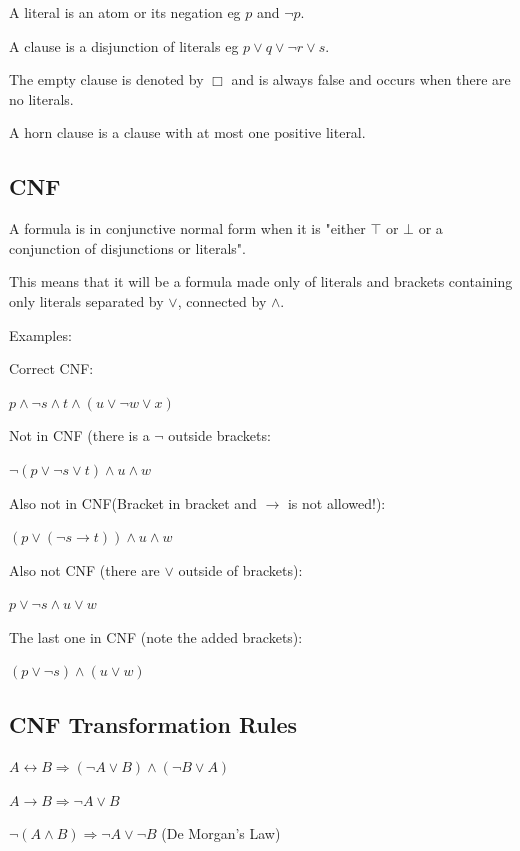 \documentclass[11pt,a4paper]{article}
\begin{document}
A literal is an atom or its negation eg $p$ and $\neg p$.

A clause is a disjunction of literals eg $p \vee q \vee \neg r \vee s$.

The empty clause is denoted by $\Box$ and is always false and occurs when there are no literals.

A horn clause is a clause with at most one positive literal.

\subsection{CNF}

A formula is in conjunctive normal form when it is "either $\top$ or $\bot$ or a conjunction of disjunctions or literals".

This means that it will be a formula made only of literals and brackets containing only literals separated by $\vee$, connected by $\wedge$.

Examples:

Correct CNF: 

$p \wedge \neg s \wedge t \wedge (u \vee \neg w \vee x)$

\vspace{5pt}
Not in CNF (there is a $\neg$ outside brackets: 

$\neg(p \vee \neg s \vee t) \wedge u \wedge w$

\vspace{5pt}
Also not in CNF(Bracket in bracket and $\rightarrow$ is not allowed!):

$(p \vee (\neg s \rightarrow t)) \wedge u \wedge w$

\vspace{5pt}
Also not CNF (there are $\vee$ outside of brackets): 

$p \vee \neg s \wedge u \vee w$

The last one in CNF (note the added brackets): 

$(p \vee \neg s) \wedge (u \vee w)$

\subsection{CNF Transformation Rules}

$A \leftrightarrow B \Rightarrow (\neg A \vee B) \wedge (\neg B \vee A)$

$A \rightarrow B \Rightarrow \neg A \vee B$

$\neg(A \wedge B) \Rightarrow \neg A \vee \neg B$ (De Morgan's Law)
\end{document}
